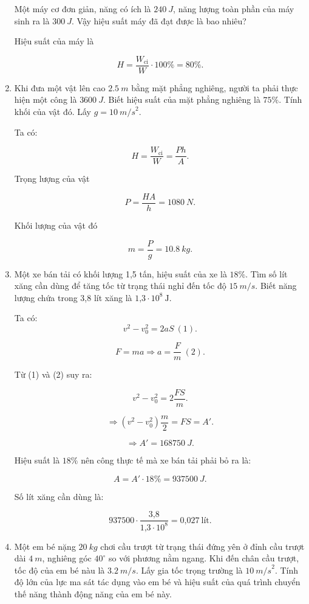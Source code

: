 \begin{enumerate}[label=\bfseries Câu \arabic*:]
	
	{
		Một máy cơ đơn giản, năng có ích là $\SI{240}{J}$, năng lượng toàn phần của máy sinh ra là $\SI{300}{J}.$ Vậy hiệu suất máy đã đạt được là bao nhiêu?
	}
	
	\hideall
	{	Hiệu suất của máy là
		
		$$H = \dfrac{W_\text{ci}}{W} \cdot 100\% = 80\%.$$ 
		
	}
	\item {}
	
	
	{
		Khi đưa một vật lên cao $\SI{2,5}{m}$ bằng mặt phẳng nghiêng, người ta phải thực hiện một công là $\SI{3600}{J}$. Biết hiệu suất của mặt phẳng nghiêng là $75\%$. Tính khối của vật đó. Lấy $g = \SI{10}{m/s}^2$.
	}
	
	\hideall
	{	Ta có:
		
		$$H = \dfrac{W_\text{ci}}{W} = \dfrac{Ph}{A}.$$
		
		Trọng lượng của vật
		
		$$P = \dfrac{HA}{h} = \SI{1080}{N}.$$
		
		Khối lượng của vật đó
		
		$$m = \dfrac{P}{g} = \SI{10,8}{kg}.$$
	}
	\item {}
	
	
	{
		Một xe bán tải có khối lượng 1,5 tấn, hiệu suất của xe là $18\%$. Tìm số lít xăng cần dùng để tăng tốc từ trạng thái nghỉ đến tốc độ $\SI{15}{m/s}$. Biết năng lượng chứa trong 3,8 lít xăng là $\text{1,3}\cdot10^8\ \text{J}$.
	}
	
	\hideall
	{	
		Ta có: $$v^2-v_0^2= 2aS\ (1).$$
		
		$$F=ma \Rightarrow a= \dfrac{F}{m}\ (2).$$
		
		Từ (1) và (2) suy ra: 
		
		$$v^2-v_0^2= 2\dfrac{FS}{m}.$$
		
		$$\Rightarrow (v^2-v_0^2)\dfrac{m}{2}= FS= A'.$$
		
		$$\Rightarrow  A'=\SI{168750}{J}.$$
		
		Hiệu suất là $18\%$ nên công thực tế mà xe bán tải phải bỏ ra là:
		
		$$A= A'\cdot 18\%= \SI{937500}{J}.$$
		
		Số lít xăng cần dùng là:
		
		 $$937500 \cdot \dfrac{\text{3,8}}{\text{1,3}\cdot 10^8} = \text{0,027}\ \text{lít}.$$
	}
	\item {}
	
	
	{
		Một em bé nặng $\SI{20}{kg}$ chơi cầu trượt từ trạng thái đứng yên ở đỉnh cầu trượt dài $\SI{4}{m}$, nghiêng góc $40^\circ$ so với phương nằm ngang. Khi đến chân cầu trượt, tốc độ của em bé nàu là $\SI{3,2}{m/s}$. Lấy gia tốc trọng trường là $\SI{10}{m/s}^2.$ Tính độ lớn của lực ma sát tác dụng vào em bé và hiệu suất của quá trình chuyển thế năng thành động năng của em bé này.
	}
	

\end{enumerate}

